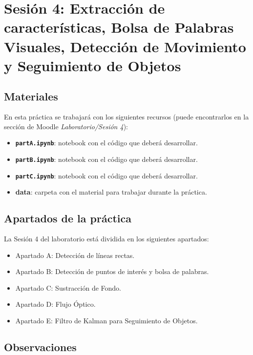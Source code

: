 \chapter{Sesión 4: Extracción de características, Bolsa de Palabras Visuales, Detección de Movimiento y Seguimiento de Objetos}
\label{chapter:introduction_ses_4}

\section{Materiales}

En esta práctica se trabajará con los siguientes recursos (puede encontrarlos en la sección de Moodle \textit{Laboratorio/Sesión 4}):

\begin{itemize}
    \item \textbf{\texttt{partA.ipynb}}: notebook con el código que deberá desarrollar.
    \item \textbf{\texttt{partB.ipynb}}: notebook con el código que deberá desarrollar.
    \item \textbf{\texttt{partC.ipynb}}: notebook con el código que deberá desarrollar.
    \item \textbf{data}: carpeta con el material para trabajar durante la práctica.
\end{itemize}

\section{Apartados de la práctica}

La Sesión 4 del laboratorio está dividida en los siguientes apartados:

\begin{itemize}
    \item Apartado A: Detección de líneas rectas.
    \item Apartado B: Detección de puntos de interés y bolsa de palabras.
    \item Apartado C: Sustracción de Fondo.
    \item Apartado D: Flujo Óptico.
    \item Apartado E: Filtro de Kalman para Seguimiento de Objetos.

\end{itemize}

\section{Observaciones}

